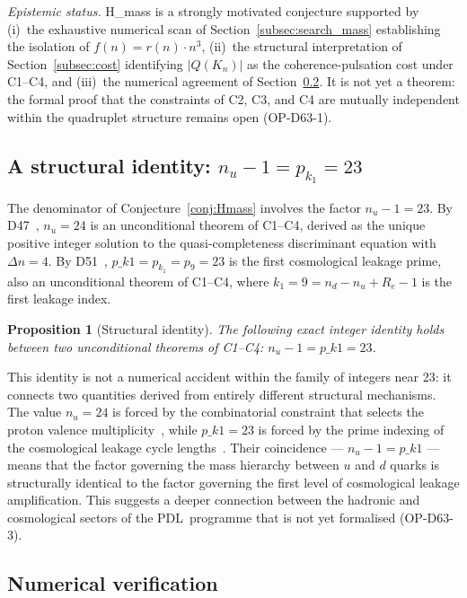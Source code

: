 \documentclass[12pt,a4paper]{article}
\def\PDL{PDL}
\def\pkone{p\_k1}
\def\QQ{Q}
\theoremstyle{plain}
\newtheorem{proposition}[theorem]{Proposition}
\theoremstyle{definition}
\theoremstyle{remark}
\newcommand{\PDL}{\textnormal{PDL}}
\newcommand{\nnu}{n_u}
\newcommand{\Dn}{\Delta n}
\newcommand{\kone}{k_1}
\newcommand{\pkone}{p_{k_1}}
\newcommand{\QQ}{\mathcal{Q}}
\begin{document}
\emph{Epistemic status.} H\_mass is a strongly motivated conjecture supported by (i)~the exhaustive numerical scan of Section~\ref{subsec:search_mass} establishing the isolation of $f(n) = r(n) \cdot n^3$, (ii)~the structural interpretation of Section~\ref{subsec:cost} identifying $|\QQ(K_n)|$ as the coherence-pulsation cost under C1--C4, and (iii)~the numerical agreement of Section~\ref{subsec:numerics_mass}. It is not yet a theorem: the formal proof that the constraints of C2, C3, and C4 are mutually independent within the quadruplet structure remains open (OP-D63-1).

\subsection{\texorpdfstring{A structural identity: $n_u - 1 = p_{k_1} = 23$}{A structural identity: nu - 1 = pk1 = 23}}
\label{subsec:identity}

The denominator of Conjecture~\ref{conj:Hmass} involves the factor $\nnu - 1 = 23$. By D47~\cite{D47}, $\nnu = 24$ is an unconditional theorem of C1--C4, derived as the unique positive integer solution to the quasi-completeness discriminant equation with $\Dn = 4$. By D51~\cite{D51}, $\pkone = p_{\kone} = p_9 = 23$ is the first cosmological leakage prime, also an unconditional theorem of C1--C4, where $k_1 = 9 = n_d - n_u + R_e - 1$ is the first leakage index.

\begin{proposition}[Structural identity]\label{prop:identity}
The following exact integer identity holds between two unconditional theorems of C1--C4: $\nnu - 1 = \pkone = 23$.
\end{proposition}

This identity is not a numerical accident within the family of integers near 23: it connects two quantities derived from entirely different structural mechanisms. The value $\nnu = 24$ is forced by the combinatorial constraint that selects the proton valence multiplicity~\cite{D47}, while $\pkone = 23$ is forced by the prime indexing of the cosmological leakage cycle lengths~\cite{D51}. Their coincidence --- $\nnu - 1 = \pkone$ --- means that the factor governing the mass hierarchy between $u$ and $d$ quarks is structurally identical to the factor governing the first level of cosmological leakage amplification. This suggests a deeper connection between the hadronic and cosmological sectors of the \PDL\ programme that is not yet formalised (OP-D63-3).

\subsection{Numerical verification}
\label{subsec:numerics_mass}
\end{document}
